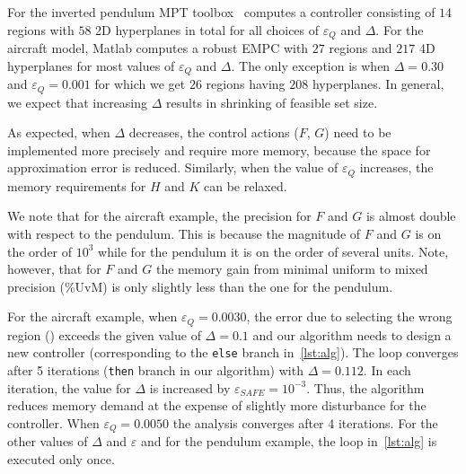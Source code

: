 

For the inverted pendulum MPT toolbox~\cite{matlabMPT} computes a controller
consisting of $14$ regions with $58$ 2D hyperplanes in total for all choices of $\varepsilon_Q$ and $\Delta$. 
For the aircraft model, Matlab computes a robust EMPC with
$27$ regions and $217$ 4D hyperplanes for most values of $\varepsilon_Q$ and $\Delta$. 
The only exception is when $\Delta=0.30$
and $\varepsilon_Q=0.001$ for which we get $26$ regions having $208$ hyperplanes.
In general, we expect that increasing $\Delta$ results in shrinking of feasible
set size.

As expected, when $\Delta$ decreases, the control actions ($F$, $G$) need to be implemented
more precisely and require more memory, because the space for approximation error
is reduced. Similarly, when the value of $\varepsilon_Q$ increases, the memory
requirements for $H$ and $K$ can be relaxed.

We note that for the aircraft example,
the precision for $F$ and $G$ is almost double with respect to the pendulum. This is
because the magnitude of $F$ and $G$ is on the order of $10^{3}$ while for the
pendulum it is on the order of several units. Note, however, that for $F$ and $G$ the memory gain
from minimal uniform to mixed precision (\%UvM) is only slightly less than the one for the pendulum.


For the aircraft example, when $\varepsilon_Q=0.0030$, the error due to selecting the wrong region (\maxUij) 
exceeds the given value of $\Delta=0.1$ and our algorithm
needs to design a new controller (corresponding to the \texttt{else} branch in~\autoref{lst:alg}). 
The loop converges after 5 iterations (\texttt{then}
branch in our algorithm) with $\Delta=0.112$. In each iteration, the value
for $\Delta$ is increased by $\varepsilon_{SAFE} = 10^{-3}$.
Thus, the algorithm reduces memory demand
at the expense of slightly more disturbance for the controller. When
$\varepsilon_Q=0.0050$ the analysis converges after 4 iterations.
For the other values of $\Delta$ and $\varepsilon$ and for the pendulum example,
the loop in~\autoref{lst:alg} is executed only once.

